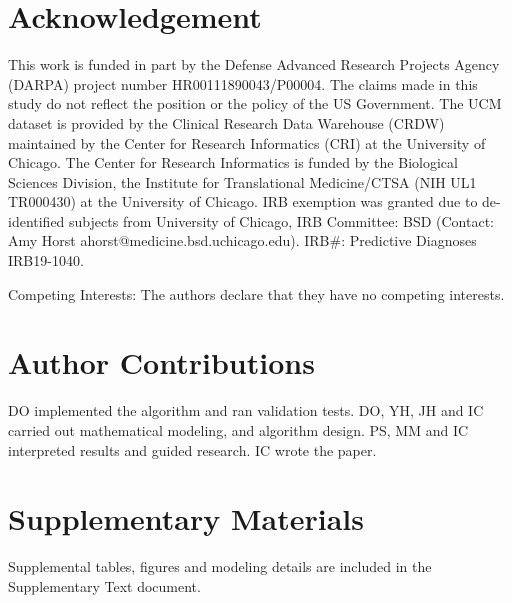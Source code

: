 \documentclass[onecolumn,,10pt]{IEEEtran}
\begin{document}
\section*{Acknowledgement}
This work is funded in part by the Defense Advanced Research Projects Agency (DARPA) project number  HR00111890043/P00004. The claims made in this study  do not  reflect the position or the policy of the US Government. The UCM dataset is provided by the Clinical Research Data Warehouse (CRDW) maintained by the Center for Research Informatics (CRI) at the  University of Chicago. The Center for Research Informatics is funded by the Biological Sciences Division, the Institute for Translational Medicine/CTSA (NIH UL1 TR000430) at the University of Chicago. IRB exemption was granted due to de-identified subjects from University of Chicago, IRB Committee: BSD (Contact: Amy Horst
ahorst@medicine.bsd.uchicago.edu). IRB\#: Predictive Diagnoses IRB19-1040.

Competing Interests: The authors declare that they have no competing interests.

\section*{Author Contributions}
DO implemented the algorithm and ran validation tests. DO, YH, JH and IC carried out mathematical modeling, and  algorithm design. PS, MM and IC interpreted results and guided research.
IC wrote the paper.

\section*{Supplementary Materials} Supplemental tables, figures and modeling details are included in the Supplementary Text document.



\end{document}
